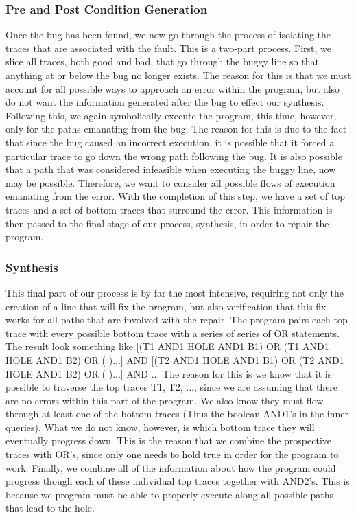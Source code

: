 \documentclass[]{article}
\begin{document}
\subsubsection{Pre and Post Condition Generation}
Once the bug has been found, we now go through the process of isolating the traces that are associated with the fault.  This is a two-part process.  First, we slice all traces, both good and bad, that go through the buggy line so that anything at or below the bug no longer exists.  The reason for this is that we must account for all possible ways to approach an error within the program, but also do not want the information generated after the bug to effect our synthesis.  Following this, we again symbolically execute the program, this time, however, only for the paths emanating from the bug.  The reason for this is due to the fact that since the bug caused an incorrect execution, it is possible that it forced a particular trace to go down the wrong path following the bug.  It is also possible that a path that was considered infeasible when executing the buggy line, now may be possible.  Therefore, we want to consider all possible flows of execution emanating from the error.  With the completion of this step, we have a set of top traces and a set of bottom traces that surround the error.  This information is then passed to the final stage of our process, synthesis, in order to repair the program.

\subsubsection{Synthesis}
This final part of our process is by far the most intensive, requiring not only the creation of a line that will fix the program, but also verification that this fix works for all paths that are involved with the repair.  The program pairs each top trace with every possible bottom trace with a series of series of OR statements.  The result look something like [(T1 AND1 HOLE AND1 B1) OR (T1 AND1 HOLE AND1 B2) OR ( )...] AND  [(T2 AND1 HOLE AND1 B1) OR (T2 AND1 HOLE AND1 B2) OR ( )...] AND ... The reason for this is we know that it is possible to traverse the top traces T1, T2, ..., since we are assuming that there are no errors within this part of the program.  We also know they must flow through at least one of the bottom traces (Thus the boolean AND1's in the inner queries).  What we do not know, however, is which bottom trace they will eventually progress down.  This is the reason that we combine the prospective traces with OR's, since only one needs to hold true in order for the program to work.  Finally, we combine all of the information about how the program could progress though each of these individual top traces together with AND2's.  This is because we program must be able to properly execute along all possible paths that lead to the hole.
\end{document}

